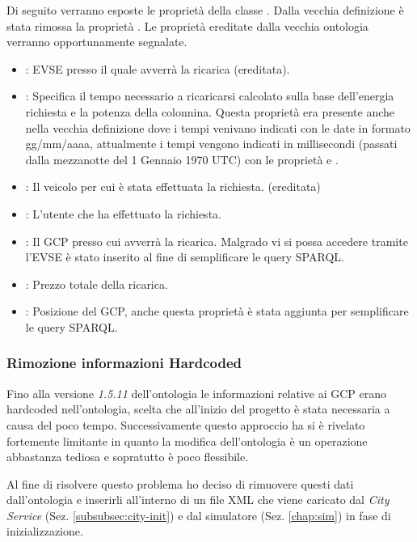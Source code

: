 Di seguito verranno esposte le proprietà della classe . Dalla vecchia definizione è stata rimossa la proprietà . Le proprietà ereditate dalla vecchia ontologia verranno opportunamente segnalate.

\begin{itemize}
	\item {}: EVSE presso il quale avverrà la ricarica (ereditata).
	\item {}: Specifica il tempo necessario a ricaricarsi calcolato sulla base dell'energia richiesta e la potenza della colonnina. Questa proprietà era presente anche nella vecchia definizione dove i tempi venivano indicati con le date in formato gg/mm/aaaa, attualmente i tempi vengono indicati in millisecondi (passati dalla mezzanotte del 1 Gennaio 1970 UTC) con le proprietà  e .
	\item {}: Il veicolo per cui è stata effettuata la richiesta. (ereditata)
	\item {}: L'utente che ha effettuato la richiesta.
	\item {}: Il GCP presso cui avverrà la ricarica. Malgrado vi si possa accedere tramite l'EVSE è stato inserito al fine di semplificare le query SPARQL.
	\item {}: Prezzo totale della ricarica.
	\item {}: Posizione del GCP, anche questa proprietà è stata aggiunta per semplificare le query SPARQL.
\end{itemize}


\subsubsection{Rimozione informazioni Hardcoded}

Fino alla versione \emph{1.5.11} dell'ontologia le informazioni relative ai GCP erano hardcoded nell'ontologia, scelta che all'inizio del progetto è stata necessaria a causa del poco tempo. Successivamente questo approccio ha si è rivelato fortemente limitante in quanto la modifica dell'ontologia è un operazione abbastanza tediosa e sopratutto è poco flessibile. 

Al fine di risolvere questo problema ho deciso di rimuovere questi dati dall'ontologia e inserirli all'interno di un file XML che viene caricato dal \emph{City Service} (Sez. \ref{subsubsec:city-init}) e dal simulatore (Sez. \ref{chap:sim}) in fase di inizializzazione.

